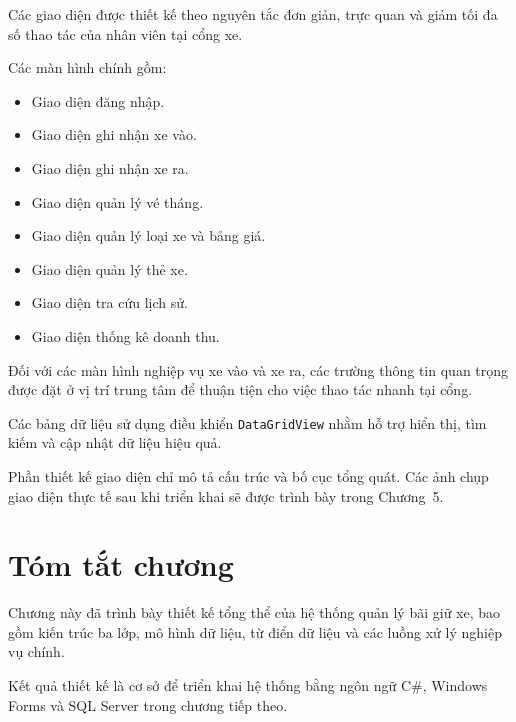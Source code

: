 Các giao diện được thiết kế theo nguyên tắc đơn giản, trực quan và giảm tối đa số thao tác của nhân viên tại cổng xe.

Các màn hình chính gồm:

\begin{itemize}
    \item Giao diện đăng nhập.
    \item Giao diện ghi nhận xe vào.
    \item Giao diện ghi nhận xe ra.
    \item Giao diện quản lý vé tháng.
    \item Giao diện quản lý loại xe và bảng giá.
    \item Giao diện quản lý thẻ xe.
    \item Giao diện tra cứu lịch sử.
    \item Giao diện thống kê doanh thu.
\end{itemize}

Đối với các màn hình nghiệp vụ xe vào và xe ra, các trường thông tin quan trọng được đặt ở vị trí trung tâm để thuận tiện cho việc thao tác nhanh tại cổng.

Các bảng dữ liệu sử dụng điều khiển \texttt{DataGridView} nhằm hỗ trợ hiển thị, tìm kiếm và cập nhật dữ liệu hiệu quả.

Phần thiết kế giao diện chỉ mô tả cấu trúc và bố cục tổng quát. Các ảnh chụp giao diện thực tế sau khi triển khai sẽ được trình bày trong Chương~5.

\section{Tóm tắt chương}

Chương này đã trình bày thiết kế tổng thể của hệ thống quản lý bãi giữ xe, bao gồm kiến trúc ba lớp, mô hình dữ liệu, từ điển dữ liệu và các luồng xử lý nghiệp vụ chính.

Kết quả thiết kế là cơ sở để triển khai hệ thống bằng ngôn ngữ C\#, Windows Forms và SQL Server trong chương tiếp theo.
